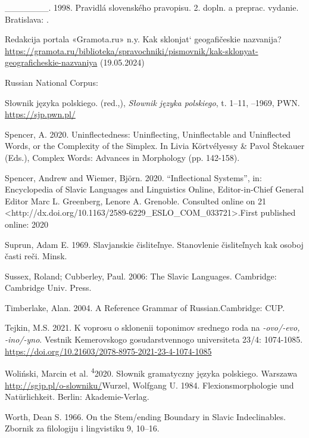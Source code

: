 \documentclass[output=paper]{langscibook}
\begin{document}
\_\_\_\_\_\_\_. 1998. Pravidlá slovenského pravopisu. 2. dopln. a preprac. vydanie. Bratislava: \citealt{Veda1998}. 

Redakcija portala «Gramota.ru» n.y. Kak sklonjat‘ geogafičeskie nazvanija? \url{https://gramota.ru/biblioteka/spravochniki/pismovnik/kak-sklonyat-geograficheskie-nazvaniya} (19.05.2024)

Russian National Corpus: 

Słownik języka polskiego. (red.,), \emph{Słownik języka polskiego}, t. 1–11, \citealt{Warszawa1958}–1969, PWN. \url{https://sjp.pwn.pl/} 

Spencer, A. 2020. Uninflectedness: Uninflecting, Uninflectable and Uninflected Words, or the Complexity of the Simplex. In Livia Körtvélyessy \& Pavol Štekauer (Eds.), Complex Words: Advances in Morphology (pp. 142-158).

Spencer, Andrew and Wiemer, Björn. 2020. “Inflectional Systems”, in: Encyclopedia of Slavic Languages and Linguistics Online, Editor-in-Chief General Editor Marc L. Greenberg, Lenore A. Grenoble. Consulted online on 21 \citealt{November2023} <http://dx.doi.org/10.1163/2589-6229\_ESLO\_COM\_033721>.First published online: 2020

Suprun, Adam E. 1969. Slavjanskie čisliteľnye. Stanovlenie čisliteľnych kak osoboj časti reči. Minsk.

Sussex, Roland; Cubberley, Paul. 2006: The Slavic Languages. Cambridge: Cambridge Univ. Press.

Timberlake, Alan. 2004. A Reference Grammar of Russian.Cambridge: CUP.

Tejkin, M.S. 2021. K voprosu o sklonenii toponimov srednego roda na \textit{{}-ovo/-evo, -ino/-yno}. Vestnik Kemerovskogo gosudarstvennogo universiteta 23/4: 1074-1085. \url{https://doi.org/10.21603/2078-8975-2021-23-4-1074-1085} 

Woliński, Marcin et al. \textsuperscript{4}2020. Słownik gramatyczny języka polskiego. Warszawa \url{http://sgjp.pl/o-slowniku/}Wurzel, Wolfgang U. 1984. Flexionsmorphologie und Natürlichkeit. Berlin: Akademie-Verlag.

\begin{styleLiteraturangabe}
Worth, Dean S. 1966. On the Stem/ending Boundary in Slavic Indeclinables. Zbornik za filologiju i lingvistiku 9, 10–16.
\end{styleLiteraturangabe}
\end{document}
